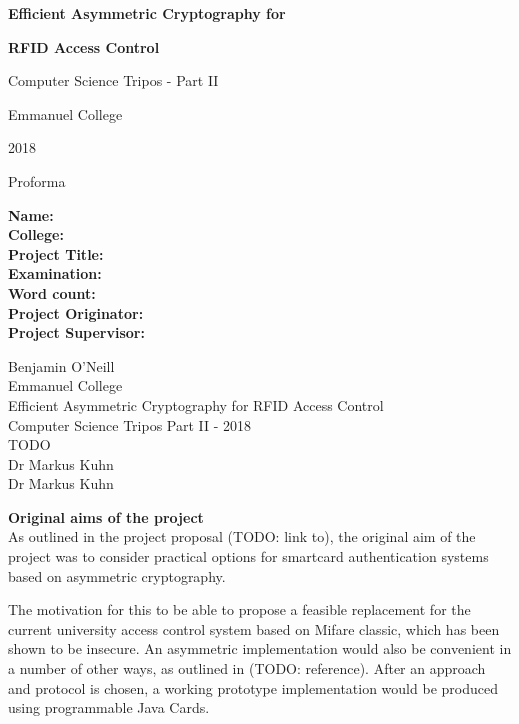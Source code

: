\documentclass[12pt,a4paper]{article}
\author{Ben O'Neill}
\begin{document}
\thispagestyle{empty}

\vfil

\centerline{\Large\bf Efficient Asymmetric Cryptography for}
\centerline{\Large\bf RFID Access Control}
\vspace{0.4in}
\centerline{\Large Computer Science Tripos - Part II}
\vspace{0.3in}
\centerline{\Large Emmanuel College}
\vspace{0.3in}
\centerline{\Large 2018}
\vfil
\pagebreak

\thispagestyle{empty}
\centerline{\Large Proforma}

\noindent
\begin{minipage}{0.3\textwidth}
\raggedright
{\bf Name:}\\
{\bf College:}\\
{\bf Project Title:}\\
{\bf Examination:}\\
{\bf Word count:}\\
{\bf Project Originator:}\\
{\bf Project Supervisor:}
\end{minipage}
\begin{minipage}{0.7\textwidth}
Benjamin O'Neill\\
Emmanuel College\\
Efficient Asymmetric Cryptography for RFID Access Control\\
Computer Science Tripos Part II - 2018\\
TODO\\
Dr Markus Kuhn\\
Dr Markus Kuhn
\end{minipage}

\vspace{0.3in}
{\large\bf Original aims of the project}\\
As outlined in the project proposal (TODO: link to), the original aim of the project was to consider practical options for smartcard authentication systems based on asymmetric cryptography. 
 
The motivation for this to be able to propose a feasible replacement for the current university access control system based on Mifare classic, which has been shown to be insecure. An asymmetric implementation would also be convenient in a number of other ways, as outlined in (TODO: reference). After an approach and protocol is chosen, a working prototype implementation would be produced using programmable Java Cards.
\end{document}

